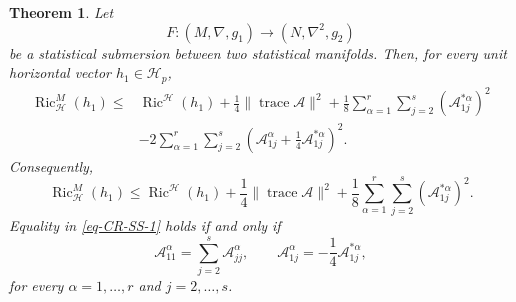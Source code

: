 \documentclass[10pt,a4paper]{article}
\newtheorem{theorem}{Theorem}[section]
\theoremstyle{definition}
\theoremstyle{remark}
\numberwithin{equation}{section}
\begin{document}
\begin{theorem}
Let
\[
F:(M,\nabla ,g_{1})\longrightarrow (N,\nabla ^2,g_{2})
\]
be a statistical submersion between two statistical manifolds. Then, for
every unit horizontal vector $h_{1}\in\mathcal H_{p}$,
\begin{align}
\operatorname{Ric}_{\mathcal H}^{M}(h_{1})
\leq{}&
\operatorname{Ric}^{\mathcal H}(h_{1})
+\frac14\|\operatorname{trace}\mathcal A\|^{2}
+\frac18\sum_{\alpha=1}^{r}\sum_{j=2}^{s}
(\mathcal A_{1j}^{*\alpha})^{2}
\nonumber\\
&-2\sum_{\alpha=1}^{r}\sum_{j=2}^{s}
\left(
\mathcal A_{1j}^{\alpha}
+\frac14\mathcal A_{1j}^{*\alpha}
\right)^{2}.
\label{eq-CR-SS}
\end{align}
Consequently,
\begin{equation}
\operatorname{Ric}_{\mathcal H}^{M}(h_{1})
\leq
\operatorname{Ric}^{\mathcal H}(h_{1})
+\frac14\|\operatorname{trace}\mathcal A\|^{2}
+\frac18\sum_{\alpha=1}^{r}\sum_{j=2}^{s}
(\mathcal A_{1j}^{*\alpha})^{2}.
\label{eq-CR-SS-1}
\end{equation}
Equality in \eqref{eq-CR-SS-1} holds if and only if
\[
\mathcal A_{11}^{\alpha}
=
\sum_{j=2}^{s}\mathcal A_{jj}^{\alpha},
\qquad
\mathcal A_{1j}^{\alpha}
=
-\frac14\mathcal A_{1j}^{*\alpha},
\]
for every $\alpha=1,\ldots,r$ and $j=2,\ldots,s$.
\end{theorem}
\end{document}
